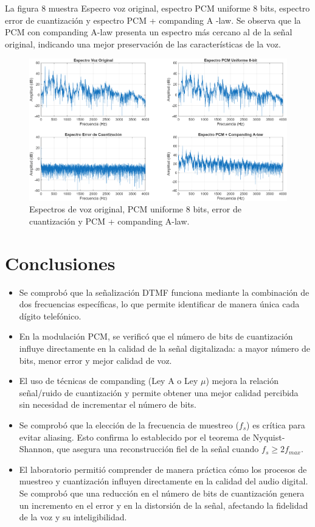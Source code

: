 \documentclass[journal]{IEEEtran} %
\begin{document}
La figura 8 muestra Especro voz original, espectro PCM uniforme 8 bits, espectro error de cuantización y espectro PCM + companding A -law. Se observa que la PCM con companding A-law presenta un espectro más cercano al de la señal original, indicando una mejor preservación de las características de la voz.
\begin{figure}[htbp]
    \centerline{\includegraphics[width=0.8\columnwidth]{Figure_8.png}}
    \caption{Espectros de voz original, PCM uniforme 8 bits, error de cuantización y PCM + companding A-law.}
    \label{fig} 
\end{figure}








\section{Conclusiones}

\begin{itemize}
    \item Se comprobó que la señalización DTMF funciona mediante la combinación de dos frecuencias específicas, lo que permite identificar de manera única cada dígito telefónico.
    
    \item En la modulación PCM, se verificó que el número de bits de cuantización influye directamente en la calidad de la señal digitalizada: a mayor número de bits, menor error y mejor calidad de voz.
    
    \item El uso de técnicas de companding (Ley A o Ley $\mu$) mejora la relación señal/ruido de cuantización y permite obtener una mejor calidad percibida sin necesidad de incrementar el número de bits.
    
    \item Se comprobó que la elección de la frecuencia de muestreo ($f_s$) es crítica para evitar aliasing. Esto confirma lo establecido por el teorema de Nyquist-Shannon, que asegura una reconstrucción fiel de la señal cuando $f_s \geq 2f_{max}$.
    
    \item El laboratorio permitió comprender de manera práctica cómo los procesos de muestreo y cuantización influyen directamente en la calidad del audio digital. Se comprobó que una reducción en el número de bits de cuantización genera un incremento en el error y en la distorsión de la señal, afectando la fidelidad de la voz y su inteligibilidad.
\end{itemize}
\end{document}
